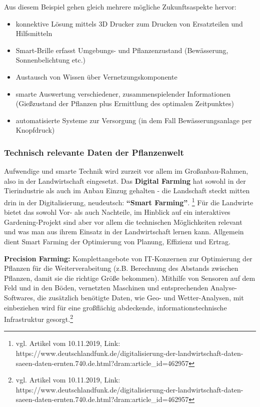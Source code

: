 Aus diesem Beispiel gehen gleich mehrere mögliche Zukunftsaspekte
hervor:

\begin{itemize}
\tightlist
\item
  konnektive Lösung mittels 3D Drucker zum Drucken von Ersatzteilen und
  Hilfsmitteln
\item
  Smart-Brille erfasst Umgebungs- und Pflanzenzustand (Bewässerung,
  Sonnenbelichtung etc.)
\item
  Austausch von Wissen über Vernetzungskomponente
\item
  smarte Auswertung verschiedener, zusammenspielender Informationen
  (Gießzustand der Pflanzen plus Ermittlung des optimalen Zeitpunktes)
\item
  automatisierte Systeme zur Versorgung (in dem Fall Bewässerungsanlage
  per Knopfdruck)
\end{itemize}

\hypertarget{technisch-relevante-daten-der-pflanzenwelt}{%
\subsubsection{Technisch relevante Daten der
Pflanzenwelt}\label{technisch-relevante-daten-der-pflanzenwelt}}

Aufwendige und smarte Technik wird zurzeit vor allem im
Großanbau-Rahmen, also in der Landwirtschaft eingesetzt. Das
\textbf{Digital Farming} hat sowohl in der Tierindustrie als auch im
Anbau Einzug gehalten - die Landschaft steckt mitten drin in der
Digitalisierung, neudeutsch: \textbf{``Smart Farming''}. \footnote{vgl.
  Artikel vom 10.11.2019, Link:
  https://www.deutschlandfunk.de/digitalisierung-der-landwirtschaft-daten-saeen-daten-ernten.740.de.html?dram:article\_id=462957}
Für die Landwirte bietet das sowohl Vor- als auch Nachteile, im Hinblick
auf ein interaktives Gardening-Projekt sind aber vor allem die
technischen Möglichkeiten relevant und was man aus ihrem Einsatz in der
Landwirtschaft lernen kann. Allgemein dient Smart Farming der
Optimierung von Planung, Effizienz und Ertrag.

\textbf{Precision Farming:} Komplettangebote von IT-Konzernen zur
Optimierung der Pflanzen für die Weiterverabeitung (z.B. Berechnung des
Abstands zwischen Pflanzen, damit sie die richtige Größe bekommen).
Mithilfe von Sensoren auf dem Feld und in den Böden, vernetzten
Maschinen und entsprechenden Analyse-Softwares, die zusätzlich benötigte
Daten, wie Geo- und Wetter-Analysen, mit einbeziehen wird für eine
großflächig abdeckende, informationstechnische Infrastruktur
gesorgt.\footnote{vgl. Artikel vom 10.11.2019, Link:
  https://www.deutschlandfunk.de/digitalisierung-der-landwirtschaft-daten-saeen-daten-ernten.740.de.html?dram:article\_id=462957}

